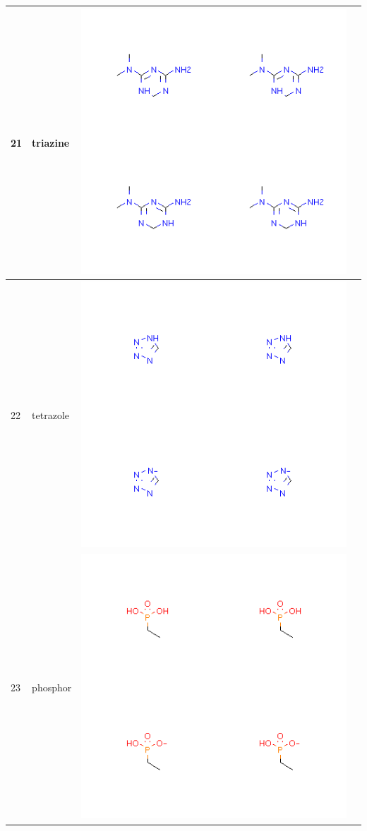 \begin{longtable}{|l|l|l|l|}
\hline
21 & triazine & \includegraphics[scale=0.6]{triazine.png} & \\
\hline
22 & tetrazole & \includegraphics[scale=0.6]{tetrazole.png} & \\
\hline
23 & phosphor & \includegraphics[scale=0.6]{phosphor.png} & \\

\end{longtable}

